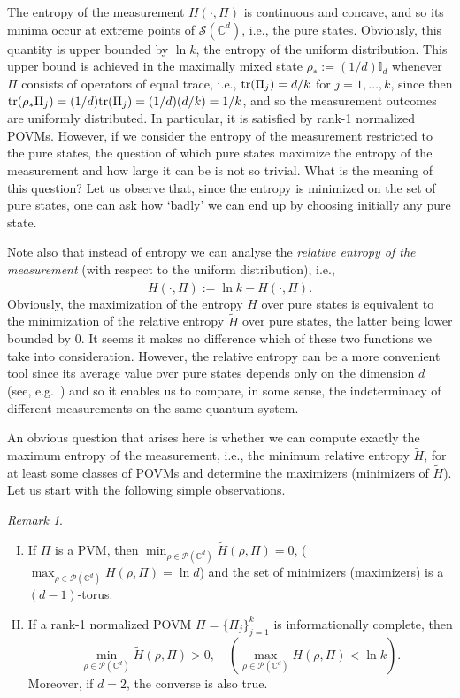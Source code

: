 \documentclass[11pt]{article}
\theoremstyle{remark}
\newtheorem{R}{Remark}
\theoremstyle{definition}
\def\tr{\textnormal{tr}}
\begin{document}
The entropy of the measurement $H(\cdot,\Pi)$ is continuous and concave, and so  its minima occur at extreme points of $\mathcal S(\mathbb C^d)$, i.e., the pure states. Obviously, this quantity is upper bounded by $\ln k$, the entropy of the uniform distribution. This upper bound is achieved in the maximally mixed state $\rho_*:=(1/d)\mathbb I_d$ whenever $\Pi$ consists of operators of equal trace, i.e., $\tr(\Pi_j)=d/k$ for $j=1,\ldots,k$, since then $\tr(\rho_*\Pi_j)=(1/d)\tr(\Pi_j)=(1/d)(d/k)=1/k$, and so the measurement outcomes are uniformly distributed. In particular, it is satisfied by rank-1 normalized POVMs.  However, if we consider  the entropy of the measurement restricted to the pure states, the question of which pure states maximize the entropy of the measurement and how large it can be is not so trivial. What is the meaning of this question? Let us observe that, since the entropy is minimized on the set of pure states, one can ask how `badly' we can end up by choosing initially any pure state.

Note also that instead of entropy we can analyse the \emph{relative entropy  of the measurement} (with respect to the uniform distribution), i.e., $$\widetilde{H}(\cdot,\Pi):=\ln k -H(\cdot,\Pi).$$ Obviously, the maximization of the entropy $H$ over pure states is equivalent to the minimization of the relative entropy $\widetilde H$ over pure states, the latter being lower bounded by 0. It seems it makes no difference which of these two functions we take into consideration. However, the relative entropy can be a more convenient tool since its average value over pure states depends only on the dimension $d$ (see, e.g.\ \cite{SloSzy16}) and so it enables us  to compare, in some sense, the indeterminacy of different  measurements on the same quantum system. 

An obvious question that arises here is whether we can compute exactly the maximum entropy of the measurement, i.e., the minimum relative entropy $\widetilde H$, for at least some classes of POVMs and determine the maximizers (minimizers of $\widetilde{H}$). 
Let us start with the following simple observations.

\begin{R}\label{fact}\hfill
	\begin{enumerate}[I.]
		
		\item If $\Pi$ is a PVM, then $\min_{\rho\in\mathcal P(\mathbb C^d)} \widetilde H(\rho,\Pi)=0$, ($\max_{\rho\in\mathcal P(\mathbb C^d)}  H(\rho,\Pi)=\ln d$)  and the set of minimizers (maximizers) is a $(d-1)$-torus.
		\item \label{fact2} If a rank-1 normalized POVM $\Pi=\{\Pi_j\}_{j=1}^k$ is informationally complete, then 
		\begin{equation}
		\min_{\rho\in\mathcal P(\mathbb C^d)} \widetilde H(\rho,\Pi)>0,\quad (\max_{\rho\in\mathcal P(\mathbb C^d)}  H(\rho,\Pi)<\ln k).
		\end{equation}
		Moreover, if $d=2$, the converse is also true.
	\end{enumerate}
\end{R}
\end{document}
